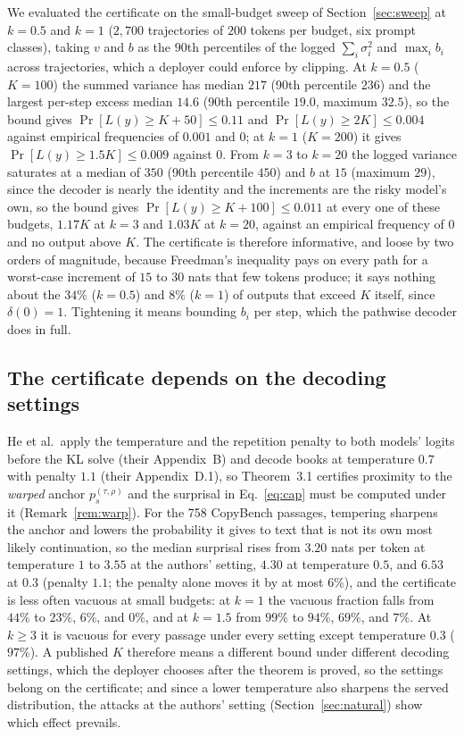 We evaluated the certificate on the small-budget sweep of Section~\ref{sec:sweep} at $k=0.5$ and $k=1$ ($2{,}700$ trajectories of $200$ tokens per budget, six prompt classes), taking $v$ and $b$ as the $90$th percentiles of the logged $\sum_i \sigma_i^2$ and $\max_i b_i$ across trajectories, which a deployer could enforce by clipping. At $k=0.5$ ($K=100$) the summed variance has median $217$ (90th percentile $236$) and the largest per-step excess median $14.6$ (90th percentile $19.0$, maximum $32.5$), so the bound gives $\Pr[L(y) \ge K+50] \le 0.11$ and $\Pr[L(y) \ge 2K] \le 0.004$ against empirical frequencies of $0.001$ and $0$; at $k=1$ ($K=200$) it gives $\Pr[L(y) \ge 1.5K] \le 0.009$ against $0$. From $k=3$ to $k=20$ the logged variance saturates at a median of $350$ (90th percentile $450$) and $b$ at $15$ (maximum $29$), since the decoder is nearly the identity and the increments are the risky model's own, so the bound gives $\Pr[L(y) \ge K+100] \le 0.011$ at every one of these budgets, $1.17K$ at $k=3$ and $1.03K$ at $k=20$, against an empirical frequency of $0$ and no output above $K$. The certificate is therefore informative, and loose by two orders of magnitude, because Freedman's inequality pays on every path for a worst-case increment of $15$ to $30$ nats that few tokens produce; it says nothing about the $34\%$ ($k=0.5$) and $8\%$ ($k=1$) of outputs that exceed $K$ itself, since $\delta(0)=1$. Tightening it means bounding $b_i$ per step, which the pathwise decoder does in full.

\subsection{The certificate depends on the decoding settings}\label{sec:warped}
He et al.\ apply the temperature and the repetition penalty to both models' logits before the KL solve (their Appendix~B) and decode books at temperature $0.7$ with penalty $1.1$ (their Appendix~D.1), so Theorem~3.1 certifies proximity to the \emph{warped} anchor $p_s^{(\tau,\rho)}$ and the surprisal in Eq.~\eqref{eq:cap} must be computed under it (Remark~\ref{rem:warp}). For the 758 CopyBench passages, tempering sharpens the anchor and lowers the probability it gives to text that is not its own most likely continuation, so the median surprisal rises from $3.20$ nats per token at temperature $1$ to $3.55$ at the authors' setting, $4.30$ at temperature $0.5$, and $6.53$ at $0.3$ (penalty $1.1$; the penalty alone moves it by at most $6\%$), and the certificate is less often vacuous at small budgets: at $k=1$ the vacuous fraction falls from $44\%$ to $23\%$, $6\%$, and $0\%$, and at $k=1.5$ from $99\%$ to $94\%$, $69\%$, and $7\%$. At $k \ge 3$ it is vacuous for every passage under every setting except temperature $0.3$ ($97\%$). A published $K$ therefore means a different bound under different decoding settings, which the deployer chooses after the theorem is proved, so the settings belong on the certificate; and since a lower temperature also sharpens the served distribution, the attacks at the authors' setting (Section~\ref{sec:natural}) show which effect prevails.




